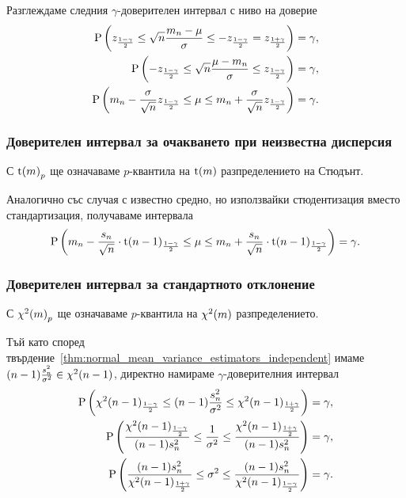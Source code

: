 \documentclass[numbers=endperiod, bibliography=totocnumbered]{scrartcl}
\begin{document}
Разглеждаме следния \( \gamma \)-доверителен интервал с ниво на доверие
\begin{align*}
  \operatorname{P} \left( z_{\frac {1-\gamma} 2} \leq \sqrt n \frac {m_n - \mu} \sigma \leq -z_{\frac {1-\gamma} 2} = z_{\frac {1+\gamma} 2} \right) &= \gamma,
  \\
  \operatorname{P} \left( -z_{\frac {1-\gamma} 2} \leq \sqrt n \frac {\mu - m_n} \sigma \leq z_{\frac {1-\gamma} 2} \right) &= \gamma,
  \\
  \operatorname{P} \left( m_n - \frac \sigma {\sqrt n} z_{\frac {1-\gamma} 2} \leq \mu \leq m_n + \frac \sigma {\sqrt n} z_{\frac {1-\gamma} 2} \right) &= \gamma.
\end{align*}

\subsubsection{Доверителен интервал за очакването при неизвестна дисперсия}

С \( {\operatorname{t}(m)}_p \) ще означаваме \( p \)-квантила на \( \operatorname{t}(m) \) разпределението на Стюдънт.

Аналогично със случая с известно средно, но използвайки стюдентизация вместо стандартизация, получаваме интервала
\begin{align*}
  \operatorname{P} \left( m_n - \frac {s_n} {\sqrt n} \cdot {\operatorname{t}(n-1)}_{\frac {1-\gamma} 2} \leq \mu \leq m_n + \frac {s_n} {\sqrt n} \cdot {\operatorname{t}(n-1)}_{\frac {1-\gamma} 2} \right) = \gamma.
\end{align*}

\subsubsection{Доверителен интервал за стандартното отклонение}

С \( {\operatorname{\chi^2}(m)}_p \) ще означаваме \( p \)-квантила на \( \operatorname{\chi^2}(m) \) разпределението.

Тъй като според твърдение~\ref{thm:normal_mean_variance_estimators_independent} имаме \( (n-1) \frac {s_n^2} {\sigma^2} \in \operatorname{\chi^2}(n-1) \), директно намираме \( \gamma \)-доверителния интервал
\begin{align*}
  \operatorname{P} \left( {\operatorname{\chi^2}(n-1)}_{\frac {1-\gamma} 2} \leq (n-1) \frac {s_n^2} {\sigma^2} \leq {\operatorname{\chi^2}(n-1)}_{\frac {1+\gamma} 2} \right) &= \gamma,
  \\
  \operatorname{P} \left( \frac {{\operatorname{\chi^2}(n-1)}_{\frac {1-\gamma} 2}} {(n-1) s_n^2} \leq \frac 1 {\sigma^2} \leq \frac {{\operatorname{\chi^2}(n-1)}_{\frac {1+\gamma} 2}} {(n-1) s_n^2} \right) &= \gamma,
  \\
  \operatorname{P} \left( \frac {(n-1) s_n^2} {{\operatorname{\chi^2}(n-1)}_{\frac {1+\gamma} 2}} \leq \sigma^2 \leq \frac {(n-1) s_n^2} {{\operatorname{\chi^2}(n-1)}_{\frac {1-\gamma} 2}} \right) &= \gamma.
\end{align*}

\printbibliography
\end{document}
